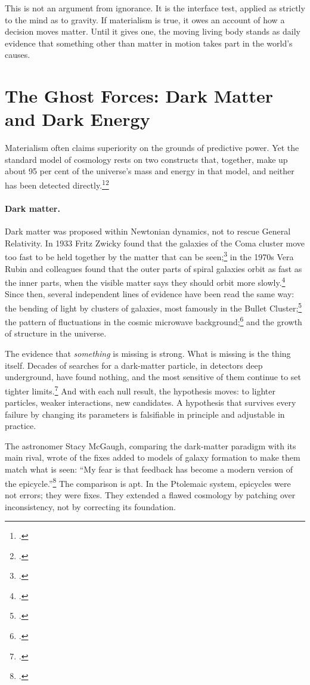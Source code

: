 \documentclass[11pt,a4paper]{article}
\newcommand{\fn}[1]{\footnote{\citealp{#1}.}}
\begin{document}
This is not an argument from ignorance. It is the interface test, applied as strictly to the mind as to gravity. If materialism is true, it owes an account of how a decision moves matter. Until it gives one, the moving living body stands as daily evidence that something other than matter in motion takes part in the world's causes.

\section{The Ghost Forces: Dark Matter and Dark Energy}
\label{sec:ghost}

Materialism often claims superiority on the grounds of predictive power. Yet the standard model of cosmology rests on two constructs that, together, make up about 95 per cent of the universe's mass and energy in that model, and neither has been detected directly.\fn{peebles2003}\fn{planck2020}

\paragraph{Dark matter.} Dark matter was proposed within Newtonian dynamics, not to rescue General Relativity. In 1933 Fritz Zwicky found that the galaxies of the Coma cluster move too fast to be held together by the matter that can be seen;\fn{zwicky1933} in the 1970s Vera Rubin and colleagues found that the outer parts of spiral galaxies orbit as fast as the inner parts, when the visible matter says they should orbit more slowly.\fn{rubin1980} Since then, several independent lines of evidence have been read the same way: the bending of light by clusters of galaxies, most famously in the Bullet Cluster;\fn{clowe2006} the pattern of fluctuations in the cosmic microwave background;\fn{planck2020} and the growth of structure in the universe.

The evidence that \emph{something} is missing is strong. What is missing is the thing itself. Decades of searches for a dark-matter particle, in detectors deep underground, have found nothing, and the most sensitive of them continue to set tighter limits.\fn{lz2023} And with each null result, the hypothesis moves: to lighter particles, weaker interactions, new candidates. A hypothesis that survives every failure by changing its parameters is falsifiable in principle and adjustable in practice.

The astronomer Stacy McGaugh, comparing the dark-matter paradigm with its main rival, wrote of the fixes added to models of galaxy formation to make them match what is seen: ``My fear is that feedback has become a modern version of the epicycle.''\fn{mcgaugh2015} The comparison is apt. In the Ptolemaic system, epicycles were not errors; they were fixes. They extended a flawed cosmology by patching over inconsistency, not by correcting its foundation.
\end{document}

